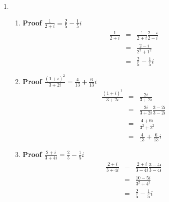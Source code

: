 \documentclass{article}%
\newcommand\abs[1]{\left|#1\right|}
\newenvironment{proof}[1][]{\begin{samepage}\textbf{Proof #1} }{\end{samepage}}
\begin{document}
\begin{enumerate}
\begin{enumerate}[label*=\arabic*.]
\begin{enumerate}[label=\alph*]
\begin{proof}[$\abs{\frac{3+4i}{4+3i}}=1$]
\begin{eqnarray*}
                                           &=&\frac{\sqrt{3^2+4^2}}{\sqrt{4^2+3^2}} \\
                                           &=&1
                \end{eqnarray*}
            \end{proof}
        \end{enumerate}
        \item %
        \begin{enumerate}[label=\alph*]
            \item %
            \begin{proof}[$\frac{1}{2+i}=\frac{2}{5}-\frac{1}{5}i$]
                \begin{eqnarray*}
                    \frac{1}{2+i}&=&\frac{1}{2+i}\frac{2-i}{2-i} \\
                                 &=&\frac{2-i}{2^2+1^2} \\
                                 &=&\frac{2}{5}-\frac{1}{5}i
                \end{eqnarray*}
            \end{proof}
            \item %
            \begin{proof}[$\frac{(1+i)^2}{3+2i}=\frac{4}{13}+\frac{6}{13}i$]
                \begin{eqnarray*}
                    \frac{(1+i)^2}{3+2i}&=&\frac{2i}{3+2i} \\
                                        &=&\frac{2i}{3+2i} \frac{3-2i}{3-2i} \\
                                        &=&\frac{4+6i}{3^2+2^2} \\
                                        &=&\frac{4}{13}+\frac{6}{13}i
                \end{eqnarray*}
            \end{proof}
            \item %
            \begin{proof}[$\frac{2+i}{3+4i}=\frac{2}{5}-\frac{1}{5}i$]
                \begin{eqnarray*}
                    \frac{2+i}{3+4i}&=&\frac{2+i}{3+4i} \frac{3-4i}{3-4i} \\
                                    &=&\frac{10-5i}{3^2+4^2} \\
                                    &=&\frac{2}{5}-\frac{1}{5}i
                \end{eqnarray*}
            \end{proof}

\end{enumerate}
\end{enumerate}
\end{enumerate}
\end{document}
